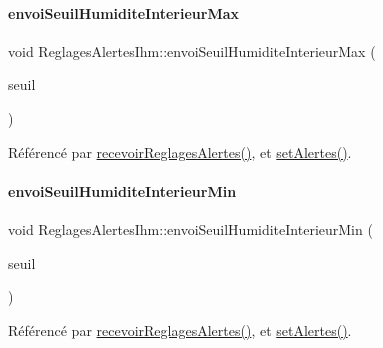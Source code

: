 \paragraph{\texorpdfstring{envoi\+Seuil\+Humidite\+Interieur\+Max}{envoiSeuilHumiditeInterieurMax}}
{\footnotesize\ttfamily void Reglages\+Alertes\+Ihm\+::envoi\+Seuil\+Humidite\+Interieur\+Max (\begin{DoxyParamCaption}\item[{Q\+String}]{seuil }\end{DoxyParamCaption})\hspace{0.3cm}{\ttfamily [signal]}}



Référencé par \hyperlink{class_reglages_alertes_ihm_a5c40f718b28b948a90574ef0c2d3e587}{recevoir\+Reglages\+Alertes()}, et \hyperlink{class_reglages_alertes_ihm_aeb0331a6103f944cb15cdd62985ca231}{set\+Alertes()}.

\mbox{\label{class_reglages_alertes_ihm_a0d913b26dd22ce48aaebed82a0d3df62}} 
\paragraph{\texorpdfstring{envoi\+Seuil\+Humidite\+Interieur\+Min}{envoiSeuilHumiditeInterieurMin}}
{\footnotesize\ttfamily void Reglages\+Alertes\+Ihm\+::envoi\+Seuil\+Humidite\+Interieur\+Min (\begin{DoxyParamCaption}\item[{Q\+String}]{seuil }\end{DoxyParamCaption})\hspace{0.3cm}{\ttfamily [signal]}}



Référencé par \hyperlink{class_reglages_alertes_ihm_a5c40f718b28b948a90574ef0c2d3e587}{recevoir\+Reglages\+Alertes()}, et \hyperlink{class_reglages_alertes_ihm_aeb0331a6103f944cb15cdd62985ca231}{set\+Alertes()}.

\mbox{\label{class_reglages_alertes_ihm_a60d8e26bf08448029f4592b10297bdd1}} 
